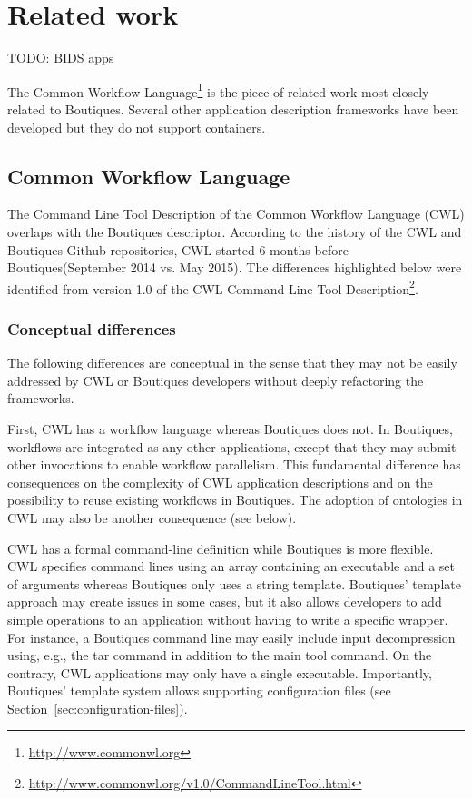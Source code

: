 \documentclass[a4paper,num-refs]{oup-contemporary}
\newcommand{\todo}[1]{\color{red}TODO: #1\color{black}}
\newcommand{\boutiques}{Boutiques\xspace}
\begin{document}

\section{Related work}

\todo{BIDS apps}

The Common Workflow Language\footnote{\url{http://www.commonwl.org}}
is the piece of related work most closely related to
\boutiques. Several other application description frameworks have been
developed but they do not support containers.

\subsection{Common Workflow Language}

The Command Line Tool Description of the Common Workflow Language
(CWL) overlaps with the \boutiques descriptor. According to the history
of the CWL and \boutiques Github repositories, CWL started 6 months
before \boutiques (September 2014 vs. May 2015). The differences
highlighted below were identified from version 1.0 of the CWL Command
Line Tool
Description\footnote{\url{http://www.commonwl.org/v1.0/CommandLineTool.html}}.

\subsubsection{Conceptual differences}

The following differences are conceptual in the sense that they may
not be easily addressed by CWL or \boutiques developers without deeply
refactoring the frameworks.

First, CWL has a workflow language whereas \boutiques does not. In
\boutiques, workflows are integrated as any other applications, except
that they may submit other invocations to enable workflow
parallelism. This fundamental difference has consequences on the
complexity of CWL application descriptions and on the possibility to
reuse existing workflows in \boutiques. The adoption of ontologies in
CWL may also be another consequence (see below).

CWL has a formal command-line definition while \boutiques is more
flexible. CWL specifies command lines using an array containing an
executable and a set of arguments whereas \boutiques only uses a
string template. \boutiques' template approach may create issues in
some cases, but it also allows developers to add simple operations to
an application without having to write a specific wrapper. For
instance, a \boutiques command line may easily include input
decompression using, e.g., the tar command in addition to the main
tool command. On the contrary, CWL applications may only have a single
executable. Importantly, \boutiques' template system allows supporting
configuration files (see Section~\ref{sec:configuration-files}).
\end{document}
